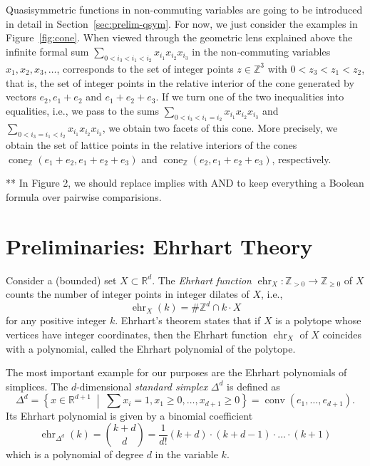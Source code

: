 \documentclass[12pt,reqno]{amsart}
\numberwithin{definition}{section}
\newcommand{\rar}{\rightarrow}
\newcommand{\RR}{\mathbb{R}}
\newcommand{\ZZ}{\mathbb{Z}}
\newcommand{\ehr}{\operatorname{ehr}}
\newcommand{\conv}{\operatorname{conv}}
\newcommand{\cone}{\operatorname{cone}}
\newcommand{\mset}[2]{ \left\{ #1 \; \middle| \; #2 \right\}}
\begin{document}
Quasisymmetric functions in non-commuting variables are going to be introduced in detail in Section~\ref{sec:prelim-qsym}. For now, we just consider the examples in Figure~\ref{fig:cone}. When viewed through the geometric lens explained above the infinite formal sum $\sum_{0<i_3<i_1<i_2} x_{i_1}x_{i_2}x_{i_3}$ in the non-commuting variables $x_1,x_2,x_3,\ldots$, corresponds to the set of integer points $z\in\ZZ^3$ with $0<z_3<z_1<z_2$, that is, the set of integer points in the relative interior of the cone generated by vectors $e_2,e_1+e_2$ and $e_1+e_2+e_3$. If we turn one of the two inequalities into equalities, i.e., we pass to the sums $\sum_{0<i_3<i_1 = i_2} x_{i_1}x_{i_2}x_{i_3}$ and $\sum_{0<i_3=i_1<i_2} x_{i_1}x_{i_2}x_{i_3}$, we obtain two facets of this cone. More precisely, we obtain the set of lattice points in the relative interiors of the cones $\cone_\ZZ(e_1+e_2,e_1+e_2+e_3)$ and $\cone_\ZZ(e_2,e_1+e_2+e_3)$, respectively.

** In Figure 2, we should replace implies with AND to keep everything a Boolean formula over pairwise comparisions. 

\section{Preliminaries: Ehrhart Theory}


Consider a (bounded) set $X\subset \RR^d$. The \emph{Ehrhart function} $\ehr_X:\ZZ_{> 0}\rar\ZZ_{\geq 0}$ of $X$ counts the number of integer points in integer dilates of $X$, i.e., \[
  \ehr_X(k) = \#\ZZ^d \cap k\cdot X
\]
for any positive integer $k$. Ehrhart's theorem states that if $X$ is a polytope whose vertices have integer coordinates, then the Ehrhart function $\ehr_X$ of $X$ coincides with a polynomial, called the Ehrhart polynomial of the polytope.

The most important example for our purposes are the Ehrhart polynomials of simplices. The $d$-dimensional \emph{standard simplex} $\Delta^d$ is defined as
\[
  \Delta^d = \mset{x\in\RR^{d+1}}{\sum x_i =1, x_1 \geq 0, \ldots, x_{d+1} \geq 0} = \conv(e_1,\ldots,e_{d+1}).
\]
Its Ehrhart polynomial is given by a binomial coefficient
\[
  \ehr_{\Delta^d}(k) = \binom{k+d}{d} = \frac{1}{d!} (k+d)\cdot (k+d-1) \cdot \ldots \cdot (k+1)
\]
which is a polynomial of degree $d$ in the variable $k$.
\end{document}
